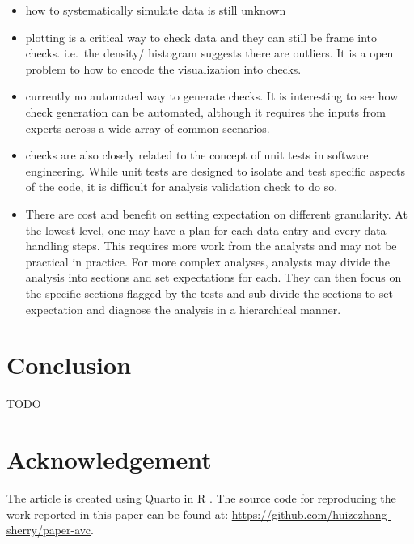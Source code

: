 \documentclass[
  12pt,
]{interact}
\begin{document}
\begin{itemize}
\item
  how to systematically simulate data is still unknown
\item
  plotting is a critical way to check data and they can still be frame
  into checks. i.e.~the density/ histogram suggests there are outliers.
  It is a open problem to how to encode the visualization into checks.
\item
  currently no automated way to generate checks. It is interesting to
  see how check generation can be automated, although it requires the
  inputs from experts across a wide array of common scenarios.
\item
  checks are also closely related to the concept of unit tests in
  software engineering. While unit tests are designed to isolate and
  test specific aspects of the code, it is difficult for analysis
  validation check to do so.
\item
  There are cost and benefit on setting expectation on different
  granularity. At the lowest level, one may have a plan for each data
  entry and every data handling steps. This requires more work from the
  analysts and may not be practical in practice. For more complex
  analyses, analysts may divide the analysis into sections and set
  expectations for each. They can then focus on the specific sections
  flagged by the tests and sub-divide the sections to set expectation
  and diagnose the analysis in a hierarchical manner.
\end{itemize}

\section{Conclusion}\label{sec-conclusion}

TODO

\section{Acknowledgement}\label{acknowledgement}

The article is created using Quarto \citep{Allaire_Quarto_2022} in R
\citep{R}. The source code for reproducing the work reported in this
paper can be found at:
\url{https://github.com/huizezhang-sherry/paper-avc}.


\renewcommand\refname{References}
  
\end{document}
